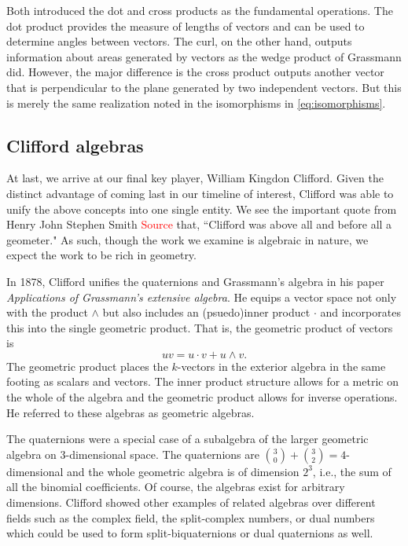 \documentclass[12pt]{article}
\begin{document}
Both introduced the dot and cross products as the fundamental operations. The dot product provides the measure of lengths of vectors and can be used to determine angles between vectors. The curl, on the other hand, outputs information about areas generated by vectors as the wedge product of Grassmann did. However, the major difference is the cross product outputs another vector that is perpendicular to the plane generated by two independent vectors. But this is merely the same realization noted in the isomorphisms in \cref{eq:isomorphisms}.


\subsection{Clifford algebras}

At last, we arrive at our final key player, William Kingdon Clifford. Given the distinct advantage of coming last in our timeline of interest, Clifford was able to unify the above concepts into one single entity. We see the important quote from Henry John Stephen Smith \textcolor{red}{Source} that, ``Clifford was above all and before all a geometer." As such, though the work we examine is algebraic in nature, we expect the work to be rich in geometry.

In 1878, Clifford unifies the quaternions and Grassmann's algebra in his paper \emph{Applications of Grassmann's extensive algebra}. He equips a vector space not only with the product $\wedge$ but also includes an (psuedo)inner product $\cdot$ and incorporates this into the single geometric product. That is, the geometric product of vectors is
\begin{equation}
\label{eq:geometric_product}
uv = u\cdot v + u \wedge v.
\end{equation}
The geometric product places the $k$-vectors in the exterior algebra in the same footing as scalars and vectors. The inner product structure allows for a metric on the whole of the algebra and the geometric product allows for inverse operations. He referred to these algebras as geometric algebras.

The quaternions were a special case of a subalgebra of the larger geometric algebra on 3-dimensional space. The quaternions are ${{3}\choose{0}}+ {{3}\choose{2}}=4$-dimensional and the whole geometric algebra is of dimension $2^3$, i.e., the sum of all the binomial coefficients. Of course, the algebras exist for arbitrary dimensions. Clifford showed other examples of related algebras over different fields such as the complex field, the split-complex numbers, or dual numbers which could be used to form split-biquaternions or dual quaternions as well.
\end{document}
